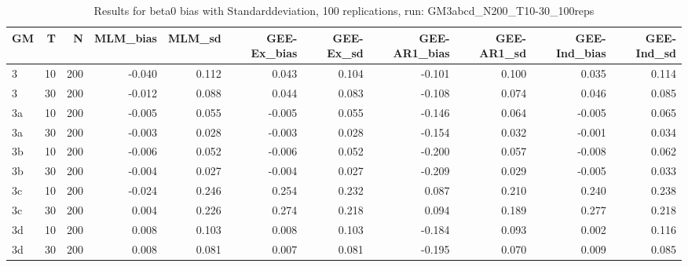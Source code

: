 \begin{table}[ht]
\centering
\begin{tabular}{lrrrrrrrrrr}
  \hline
GM & T & N & MLM\_bias & MLM\_sd & GEE-Ex\_bias & GEE-Ex\_sd & GEE-AR1\_bias & GEE-AR1\_sd & GEE-Ind\_bias & GEE-Ind\_sd \\ 
  \hline
3 & 10 & 200 & -0.040 & 0.112 & 0.043 & 0.104 & -0.101 & 0.100 & 0.035 & 0.114 \\ 
  3 & 30 & 200 & -0.012 & 0.088 & 0.044 & 0.083 & -0.108 & 0.074 & 0.046 & 0.085 \\ 
  3a & 10 & 200 & -0.005 & 0.055 & -0.005 & 0.055 & -0.146 & 0.064 & -0.005 & 0.065 \\ 
  3a & 30 & 200 & -0.003 & 0.028 & -0.003 & 0.028 & -0.154 & 0.032 & -0.001 & 0.034 \\ 
  3b & 10 & 200 & -0.006 & 0.052 & -0.006 & 0.052 & -0.200 & 0.057 & -0.008 & 0.062 \\ 
  3b & 30 & 200 & -0.004 & 0.027 & -0.004 & 0.027 & -0.209 & 0.029 & -0.005 & 0.033 \\ 
  3c & 10 & 200 & -0.024 & 0.246 & 0.254 & 0.232 & 0.087 & 0.210 & 0.240 & 0.238 \\ 
  3c & 30 & 200 & 0.004 & 0.226 & 0.274 & 0.218 & 0.094 & 0.189 & 0.277 & 0.218 \\ 
  3d & 10 & 200 & 0.008 & 0.103 & 0.008 & 0.103 & -0.184 & 0.093 & 0.002 & 0.116 \\ 
  3d & 30 & 200 & 0.008 & 0.081 & 0.007 & 0.081 & -0.195 & 0.070 & 0.009 & 0.085 \\ 
   \hline
\end{tabular}
\caption{Results for beta0 bias with Standarddeviation, 100 replications, run: GM3abcd_N200_T10-30_100reps} 
\label{tab:beta0_bias_sd}
\end{table}

